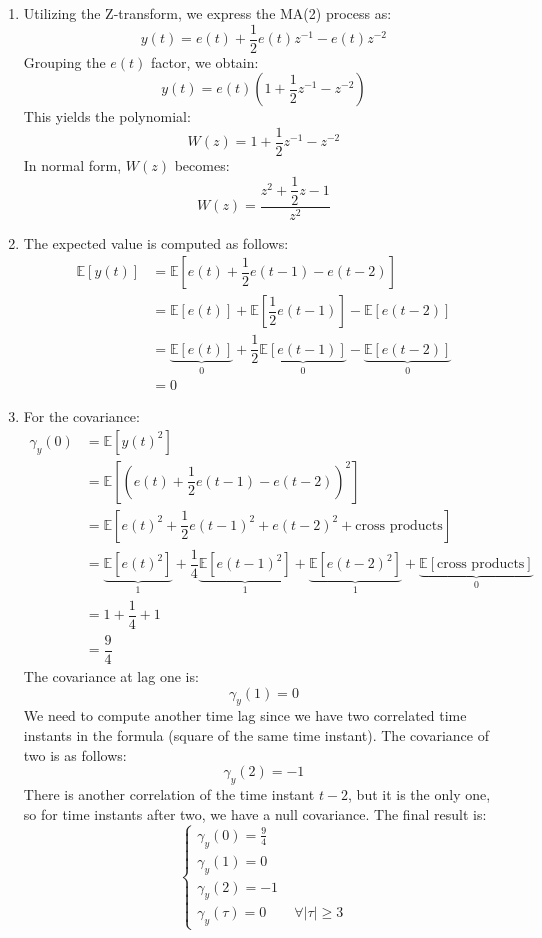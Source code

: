 \begin{enumerate}
    \item Utilizing the Z-transform, we express the MA(2) process as:
        \[y(t)=e(t)+\dfrac{1}{2}e(t)z^{-1}-e(t)z^{-2}\]
        Grouping the $e(t)$ factor, we obtain:
        \[y(t)=e(t)\left(1+\dfrac{1}{2}z^{-1}-z^{-2}\right)\]
        This yields the polynomial:
        \[W(z)=1+\dfrac{1}{2}z^{-1}-z^{-2}\]
        In normal form, $W(z)$ becomes:
        \[W(z)=\dfrac{z^2+\dfrac{1}{2}z-1}{z^2}\]
    \item The expected value is computed as follows:
        \begin{align*}
            \mathbb{E}\left[y(t)\right]     &= \mathbb{E}\left[e(t)+\dfrac{1}{2}e(t-1)-e(t-2)\right] \\
                                            &= \mathbb{E}\left[e(t)\right]+\mathbb{E}\left[\dfrac{1}{2}e(t-1)\right]-\mathbb{E}\left[e(t-2)\right] \\
                                            &= \underbrace{\mathbb{E}\left[e(t)\right]}_0 +\dfrac{1}{2}\underbrace{\mathbb{E}\left[e(t-1)\right]}_0 -\underbrace{\mathbb{E}\left[e(t-2)\right]}_0  \\
                                            &= 0
        \end{align*}
    \item For the covariance:
        \begin{align*}
            \gamma_y(0)     &= \mathbb{E}\left[{y(t)}^2\right] \\
                            &= \mathbb{E}\left[{\left( e(t)+\dfrac{1}{2}e(t-1)-e(t-2) \right)}^2\right] \\
                            &= \mathbb{E}\left[ {e(t)}^2 + \dfrac{1}{2}{e(t-1)}^2 + {e(t-2)}^2  + \text{cross products} \right] \\
                            &= \underbrace{\mathbb{E}\left[ {e(t)}^2 \right]}_1  + \dfrac{1}{4}\underbrace{\mathbb{E}\left[{e(t-1)}^2\right]}_1  + \underbrace{\mathbb{E}\left[{e(t-2)}^2\right]}_1  + \underbrace{\mathbb{E}\left[\text{cross products}\right]}_0  \\
                            &= 1  + \dfrac{1}{4} + 1\\
                            &= \dfrac{9}{4}
        \end{align*}
        The covariance at lag one is:
        \[\gamma_y(1)=0\]
        We need to compute another time lag since we have two correlated time instants in the formula (square of the same time instant).
        The covariance of two is as follows:
        \[\gamma_y(2)=-1\]
        There is another correlation of the time instant $t-2$, but it is the only one, so for time instants after two, we have a null covariance.
        The final result is:
        \[\begin{cases}
            \gamma_y(0)=\frac{9}{4} \\
            \gamma_y(1)=0 \\
            \gamma_y(2)=-1 \\
            \gamma_y(\tau)=0 \qquad \forall\left\lvert \tau\right\rvert \geq 3
        \end{cases}\]
\end{enumerate}
